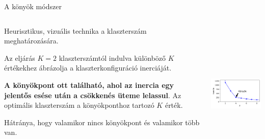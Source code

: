 \documentclass[english, aspectratio=169]{beamer}
\begin{document}
\begin{frame}{A könyök módszer}
\begin{columns}
\begin{column}{.5\textwidth}
Heurisztikus, vizuális technika a klaszterszám meghatározására.\par\smallskip
Az eljárás $K=2$ klaszterszámtól indulva különböző $K$ értékekhez ábrázolja a klaszterkonfiguráció inerciáját.\par\smallskip
\textbf{A könyökpont ott található, ahol az inercia egy jelentős esése után a csökkenés üteme lelassul}. Az optimális klaszterszám a könyökponthoz tartozó $K$ érték.\par\medskip
Hátránya, hogy valamikor nincs könyökpont és valamikor több van. 
\end{column}
\begin{column}{.5\textwidth}
\begin{center}
\includegraphics[width=7cm, height=7cm, keepaspectratio]{images/unsupervised_30.png}
\end{center}
\end{column}
\end{columns}
\end{frame}
\end{document}
